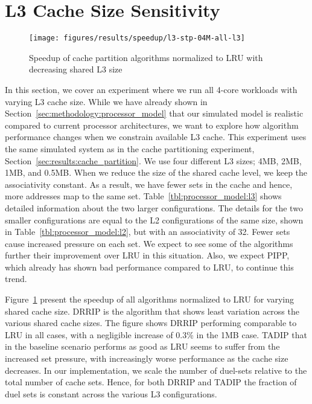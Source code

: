 \section{L3 Cache Size Sensitivity}
\label{sec:results:l3size_sensitivity}


\begin{figure}[th]
    \centering
    \texttt{[image: figures/results/speedup/l3-stp-04M-all-l3]}
    \caption{Speedup of cache partition algorithms normalized to LRU with decreasing shared L3 size}
    \label{fig:results:l3}
\end{figure}

In this section, we cover an experiment where we run all 4-core workloads with varying L3 cache size.
While we have already shown in Section~\ref{sec:methodology:processor_model} that our simulated model is realistic compared to current processor architectures, we want to explore how algorithm performance changes when we constrain available L3 cache.
This experiment uses the same simulated system as in the cache partitioning experiment, Section~\ref{sec:results:cache_partition}.
We use four different L3 sizes; 4MB, 2MB, 1MB, and 0.5MB.
When we reduce the size of the shared cache level, we keep the associativity constant.
As a result, we have fewer sets in the cache and hence, more addresses map to the same set.
Table~\ref{tbl:processor_model:l3} shows detailed information about the two larger configurations.
The details for the two smaller configurations are equal to the L2 configurations of the same size, shown in Table~\ref{tbl:processor_model:l2}, but with an associativity of 32.
Fewer sets cause increased pressure on each set.
We expect to see some of the algorithms further their improvement over LRU in this situation.
Also, we expect PIPP, which already has shown bad performance compared to LRU, to continue this trend.

Figure~\ref{fig:results:l3} present the speedup of all algorithms normalized to LRU for varying shared cache size.
DRRIP is the algorithm that shows least variation across the various shared cache sizes.
The figure shows DRRIP performing comparable to LRU in all cases, with a negligible increase of 0.3\% in the 1MB case.
TADIP that in the baseline scenario performs as good as LRU seems to suffer from the increased set pressure, with increasingly worse performance as the cache size decreases.
In our implementation, we scale the number of duel-sets relative to the total number of cache sets.
Hence, for both DRRIP and TADIP the fraction of duel sets is constant across the various L3 configurations.

